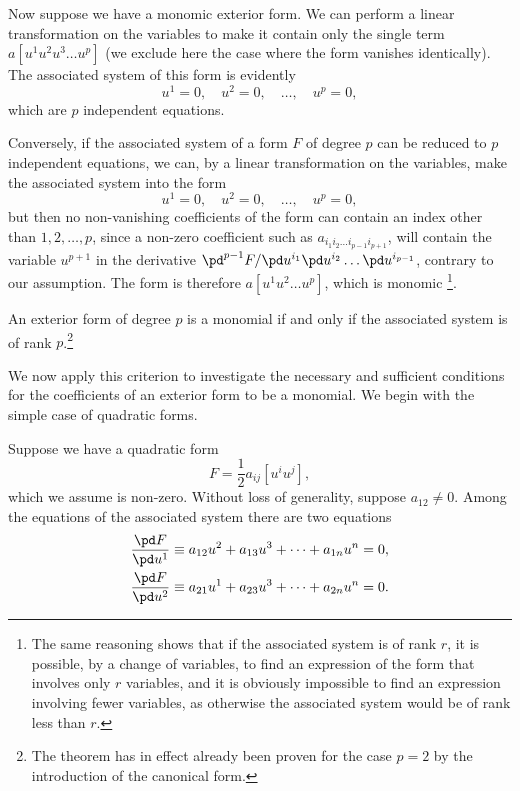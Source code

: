 Now suppose we have a monomic exterior form. We can perform a linear transformation on the variables to make it contain only the single term $a[u^{1}u^{2}u^{3}\dots u^{p}]$ (we exclude here the case where the form vanishes identically). The associated system of this form is evidently
\[
u^{1}=0,\quad u^{2}=0,\quad\dots,\quad u^{p}=0,
\]
which are $p$ independent equations.

Conversely, if the associated system of a form $F$ of degree $p$ can be reduced to $p$ independent equations, we can, by a linear transformation on the variables, make the associated system into the form
\[
u^{1}=0,\quad u^{2}=0,\quad\dots,\quad u^{p}=0,
\]
but then no non-vanishing coefficients of the form can contain an index other than $1,2,\dots,p$, since a non-zero coefficient such as $a_{i_{1}i_{2}\dots i_{p-1} i_{p+1}}$, will contain the variable $u^{p+1}$ in the derivative $\pd^{p-1}F/\pd u^{i_{1}}\pd u^{i_{2}}\dots\pd u^{i_{p-1}}$, contrary to our assumption. The form is therefore $a[u^{1}u^{2}\dots u^{p}]$, which is monomic \footnote{The same reasoning shows that if the associated system is of rank $r$, it is possible, by a change of variables, to find an expression of the form that involves only $r$ variables, and it is obviously impossible to find an expression involving fewer variables, as otherwise the associated system would be of rank less than $r$.}.
\begin{thm*}
  An exterior form of degree $p$ is a monomial if and only if the associated system is of rank $p$.\footnote{The theorem has in effect already been proven for the case $p=2$ by the introduction of the canonical form.}
\end{thm*}

\vspace{12pt}\fsec We now apply this criterion to investigate the necessary and sufficient conditions for the coefficients of an exterior form to be a monomial. We begin with the simple case of quadratic forms.

Suppose we have a quadratic form
\[
F=\frac{1}{2}a_{ij}[u^{i}u^{j}],
\]
which we assume is non-zero. Without loss of generality, suppose $a_{12}\neq 0$. Among the equations of the associated system there are two equations
\begin{align*}
  \frac{\pd F}{\pd u^{1}}&\equiv a_{12}u^{2}+a_{13}u^{3}+\dots+a_{1n}u^{n}=0,\\
  \frac{\pd F}{\pd u^{2}}&\equiv a_{21}u^{1}+a_{23}u^{3}+\dots+a_{2n}u^{n}=0.
\end{align*}

